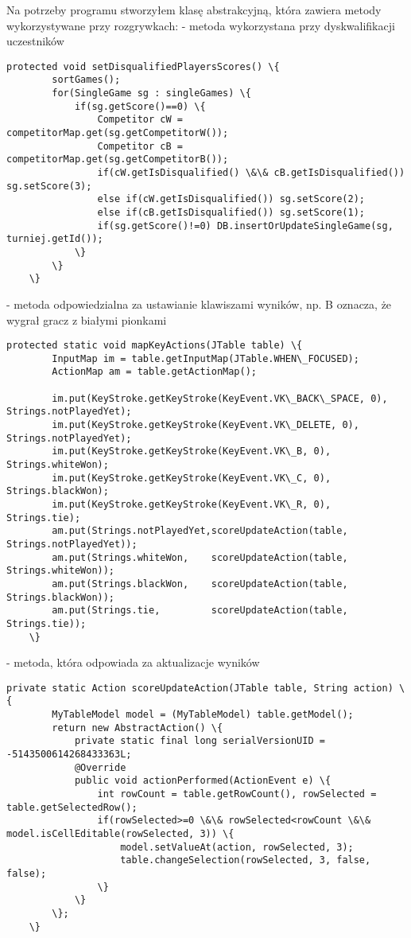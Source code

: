 Na potrzeby programu stworzyłem klasę abstrakcyjną, która zawiera metody wykorzystywane przy rozgrywkach:
- metoda wykorzystana przy dyskwalifikacji uczestników
\begin{verbatim}
protected void setDisqualifiedPlayersScores() \{
		sortGames();
		for(SingleGame sg : singleGames) \{
			if(sg.getScore()==0) \{
				Competitor cW = competitorMap.get(sg.getCompetitorW());
				Competitor cB = competitorMap.get(sg.getCompetitorB());
				if(cW.getIsDisqualified() \&\& cB.getIsDisqualified()) sg.setScore(3);
				else if(cW.getIsDisqualified()) sg.setScore(2);
				else if(cB.getIsDisqualified()) sg.setScore(1);
				if(sg.getScore()!=0) DB.insertOrUpdateSingleGame(sg, turniej.getId());
			\}
		\}
	\}
\end{verbatim}
- metoda odpowiedzialna za ustawianie klawiszami wyników, np. B oznacza, że wygrał gracz z białymi pionkami
\begin{verbatim}
protected static void mapKeyActions(JTable table) \{
		InputMap im = table.getInputMap(JTable.WHEN\_FOCUSED);
		ActionMap am = table.getActionMap();

		im.put(KeyStroke.getKeyStroke(KeyEvent.VK\_BACK\_SPACE, 0), 	Strings.notPlayedYet);
		im.put(KeyStroke.getKeyStroke(KeyEvent.VK\_DELETE, 0), 		Strings.notPlayedYet);
		im.put(KeyStroke.getKeyStroke(KeyEvent.VK\_B, 0), Strings.whiteWon);
		im.put(KeyStroke.getKeyStroke(KeyEvent.VK\_C, 0), Strings.blackWon);
		im.put(KeyStroke.getKeyStroke(KeyEvent.VK\_R, 0), Strings.tie);
		am.put(Strings.notPlayedYet,scoreUpdateAction(table, Strings.notPlayedYet));
		am.put(Strings.whiteWon, 	scoreUpdateAction(table, Strings.whiteWon));
		am.put(Strings.blackWon, 	scoreUpdateAction(table, Strings.blackWon));
		am.put(Strings.tie, 	 	scoreUpdateAction(table, Strings.tie));
	\}
\end{verbatim}
- metoda, która odpowiada za aktualizacje wyników
\begin{verbatim}
private static Action scoreUpdateAction(JTable table, String action) \{
		MyTableModel model = (MyTableModel) table.getModel();
		return new AbstractAction() \{
			private static final long serialVersionUID = -5143500614268433363L;
			@Override
		    public void actionPerformed(ActionEvent e) \{
				int rowCount = table.getRowCount(), rowSelected = table.getSelectedRow();
				if(rowSelected>=0 \&\& rowSelected<rowCount \&\& model.isCellEditable(rowSelected, 3)) \{
					model.setValueAt(action, rowSelected, 3);
					table.changeSelection(rowSelected, 3, false, false);
				\}
		    \}
		\};
	\}
\end{verbatim}

